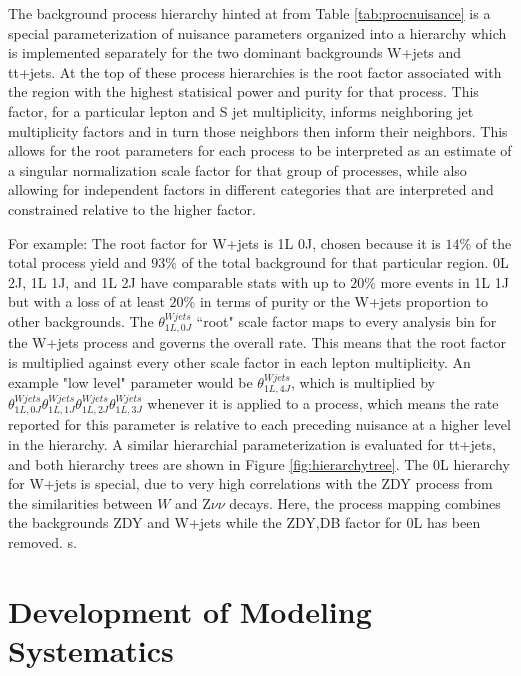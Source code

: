The background process hierarchy hinted at from Table \ref{tab:procnuisance} is a special parameterization of nuisance parameters organized into a hierarchy which is implemented separately for the two dominant backgrounds W+jets and tt+jets. At the top of these process hierarchies is the root factor  associated with the region with the highest statisical power and purity for that process. This factor, for a particular lepton and S jet multiplicity, informs neighboring jet multiplicity factors and in turn those neighbors then inform their neighbors. This allows for the root parameters for each process to be interpreted as an estimate of a singular normalization scale factor for that group of processes, while also allowing for independent factors in different categories that are interpreted and constrained relative to the higher factor. 

For example: The root factor for W+jets is 1L 0J, chosen because it is $14\%$ of the total process yield and $93\%$ of the total background for that particular region. 0L 2J, 1L 1J, and 1L 2J have comparable stats with up to $20\%$ more events in 1L 1J but with a loss of at least $20\%$ in terms of purity or the W+jets proportion to other backgrounds. The $\theta^{Wjets}_{1L, 0J}$ ``root" scale factor maps to every analysis bin for the W+jets process and governs the overall rate. This means that the root factor is multiplied against every other scale factor in each lepton multiplicity. An example "low level" parameter would be $\theta^{Wjets}_{1L, 4J}$, which is multiplied by $\theta^{Wjets}_{1L, 0J}\theta^{Wjets}_{1L, 1J}\theta^{Wjets}_{1L ,2J}\theta^{Wjets}_{1L, 3J}$ whenever it is applied to a process, which means the rate reported for this parameter is relative to each preceding nuisance at a higher level in the hierarchy.  A similar hierarchial parameterization is evaluated for tt+jets, and both hierarchy trees are shown in Figure \ref{fig:hierarchytree}. The 0L hierarchy for W+jets is special, due to very high correlations with the ZDY process from the similarities between $W$ and Z$\nu\nu$ decays. Here, the process mapping combines the backgrounds ZDY and W+jets while the ZDY,DB factor for 0L has been removed. s.

\section{Development of Modeling Systematics}



